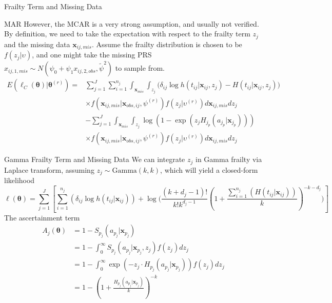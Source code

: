 \documentclass [aspectratio=169]{beamer}
\begin{document}
\begin{frame}{Frailty Term and Missing Data}  
    \begin{block}{MAR}
        However, the MCAR is a very strong assumption, and usually not verified. 
        By definition, we need to take the expectation with respect to the frailty term $z_j$ and the missing data $\mathbf{x}_{ij,mis}$. 
        Assume the frailty distribution is chosen to be $f(z_j|\upsilon)$, and one might take the missing PRS $x_{ij,1,mis}\sim N(\psi_0+\psi_1x_{ij,2,obs}, \tilde{\psi}^2)$ to sample from. 
        \begin{align} 
            E(\ell_C(\boldsymbol{\theta})|\boldsymbol{\theta}^{(r)})=&\sum_{j=1}^J\sum_{i=1}^{n_j}\int_{\mathbf{x}_{mis}} \int_{z_j}\Big (\delta_{ij}\log h(t_{ij}|\mathbf{x}_{ij}, z_j) - H(t_{ij}|\mathbf{x}_{ij}, z_j)\Big )\\
            &\times f(\mathbf{x}_{ij,mis}|\mathbf{x}_{obs,ij},\psi^{(r)})f(z_j|\upsilon^{(r)})d\mathbf{x}_{ij,mis}dz_j\\
            &-\sum_{j=1}^J \int_{\mathbf{x}_{mis}} \int_{z_j} \log(1- \exp(z_j H_{j_p}(a_{j_p}|\mathbf{x}_{j_p})))\\
            &\times f(\mathbf{x}_{ij,mis}|\mathbf{x}_{obs,ij},\psi^{(r)})f(z_j|\upsilon^{(r)})d\mathbf{x}_{ij,mis}dz_j
        \end{align}
    \end{block}
\end{frame}

\begin{frame}{Gamma Frailty Term and Missing Data} 
    We can integrate $z_j$ in Gamma frailty via Laplace transform, assuming $z_j\sim\text{Gamma}(k,k)$, which will yield a closed-form likelihood
    \begin{equation} 
        \ell(\boldsymbol{\theta})=\sum_{j=1}^J\left [\sum_{i=1}^{n_j}(\delta_{ij}\log h(t_{ij}|\mathbf{x}_{ij})) + \log\Big (\frac{(k+d_j-1)!}{k!k^{d_j-1}}(1+\frac{\sum_{i=1}^{n_j}(H(t_{ij}|\mathbf{x}_{ij}))}{k})^{-k-d_j}\Big )\right ]
    \end{equation}
    The ascertainment term 
    \begin{align} 
    A_j(\boldsymbol{\theta})&=1-S_{p_j}(a_{p_j}|\mathbf{x}_{p_j})\\
    &=1-\int_0^{\infty} S_{p_j}(a_{p_j}|\mathbf{x}_{p_j},z_j)f(z_j)dz_j\\
    &=1-\int_0^{\infty}\exp(-z_j\cdot H_{p_j}(a_{p_j}|\mathbf{x}_{p_j}))f(z_j)dz_j\\
    &=1-(1+\frac{H_{p_j}(a_{p_j}|\mathbf{x}_{p_j})}{k})^{-k}
    \end{align}
\end{frame}
\end{document}
